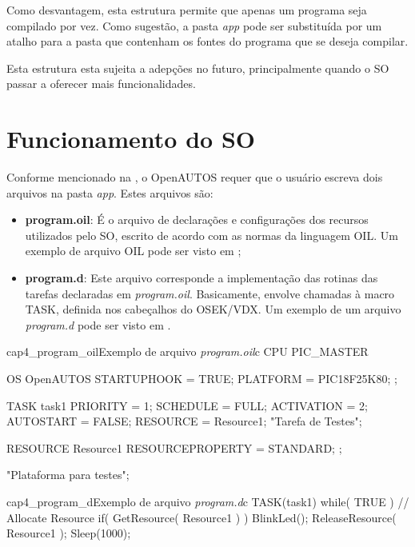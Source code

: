 Como desvantagem, esta estrutura permite que apenas um programa seja compilado por vez. Como sugestão, a pasta \emph{app} pode ser substituída por um atalho para a pasta que contenham os fontes do programa que se deseja compilar.

Esta estrutura esta sujeita a adepções no futuro, principalmente quando o SO passar a oferecer mais funcionalidades.

\section{Funcionamento do SO} \label{cap:cap4_utilizando_o_sistema}

Conforme mencionado na , o OpenAUTOS requer que o usuário escreva dois arquivos na pasta \emph{app}. Estes arquivos são:

\begin{itemize}
	\item \textbf{program.oil}: É o arquivo de declarações e configurações dos recursos utilizados pelo SO, escrito de acordo com as normas da linguagem OIL. Um exemplo de arquivo OIL pode ser visto em ;
	\item \textbf{program.d}: Este arquivo corresponde a implementação das rotinas das tarefas declaradas em \emph{program.oil}. Basicamente, envolve chamadas à macro TASK, definida nos cabeçalhos do OSEK/VDX. Um exemplo de um arquivo \emph{program.d} pode ser visto em .
\end{itemize}

\begin{algoritmo}{cap4_program_oil}{Exemplo de arquivo \emph{program.oil}}{c}
CPU PIC_MASTER {
	OS OpenAUTOS {
		STARTUPHOOK = TRUE;
		PLATFORM = PIC18F25K80;
	};
	
	TASK task1 {
		PRIORITY = 1;
		SCHEDULE = FULL;
		ACTIVATION = 2;
		AUTOSTART = FALSE;
		RESOURCE = Resource1;
	} "Tarefa de Testes";
	
	RESOURCE Resource1 {
		RESOURCEPROPERTY = STANDARD;
	};
} "Plataforma para testes";
\end{algoritmo}

\begin{algoritmo}{cap4_program_d}{Exemplo de arquivo \emph{program.d}}{c}
TASK(task1) {
	while( TRUE ) {
		// Allocate Resource
		if( GetResource( Resource1 ) ) {
			BlinkLed();
			ReleaseResource( Resource1 );
		}
		Sleep(1000);
	}	
}
\end{algoritmo}

